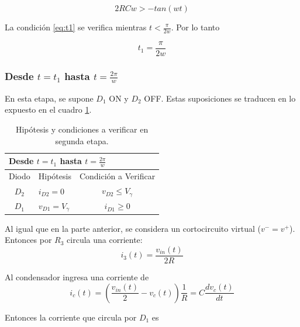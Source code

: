 \begin{equation*}
2RCw > -tan(wt)
\label{eq:t1}
\end{equation*}

La condición \ref{eq:t1} se verifica mientras $t < \frac{\pi}{2w}$.  Por lo tanto 

\begin{equation}
t_{1} = \frac{\pi}{2w}
\end{equation}

\subsubsection{Desde $t=t_1$ hasta $t=\frac{2\pi}{w}$}

En esta etapa, se supone $D_1$ ON y $D_2$ OFF. Estas suposiciones se traducen en lo expuesto en el cuadro \ref{cuadro:DSegEtapa}.


\begin{table}[htb]
	\centering
	\caption{Hipótesis y condiciones a verificar en segunda etapa.}
	\label{cuadro:DSegEtapa}
	\begin{tabular}{lll}
		\multicolumn{3}{l}{Desde $t=t_1$ hasta $t=\frac{2\pi}{w}$}                                                                      \\ \hline
		\multicolumn{1}{|l|}{Diodo} & \multicolumn{1}{l|}{Hipótesis}          & \multicolumn{1}{c|}{Condición a Verificar}             \\ \hline
		\multicolumn{1}{|c|}{$D_2$} & \multicolumn{1}{l|}{$i_{D2}=0$}         & \multicolumn{1}{c|}{$v_{D2}\leq V_\gamma$} \\ \hline
		\multicolumn{1}{|c|}{$D_1$} & \multicolumn{1}{l|}{$v_{D1}= V_\gamma$} & \multicolumn{1}{c|}{$i_{D1}\geq 0$}        \\ \hline
	\end{tabular}
\end{table}

Al igual que en la parte anterior, se considera un cortocircuito virtual ($v^-=v^+$). Entonces por $R_3$ circula una corriente:
\begin{equation*}
	i_3(t) = \frac{v_{in}(t)}{2R}
\end{equation*}

Al condensador ingresa una corriente de
\begin{equation*}
		i_c(t) = \left( \frac{v_{in}(t)}{2}-v_{c}(t)\right) \frac{1}{R} = C \frac{dv_{c}(t)}{dt}
\end{equation*}

Entonces la corriente que circula por $D_1$ es 

